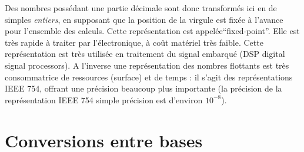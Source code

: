 \documentclass[a4paper,11pt]{article}
\begin{document}
Des nombres possédant une partie décimale sont donc transformés ici en de simples {\it entiers}, en supposant que la position de la virgule est fixée à l'avance pour l'ensemble des calculs. Cette représentation est appelée``fixed-point''. Elle est très rapide à traiter par l'électronique, à coût matériel très faible. Cette représentation est très utilisée en traitement du signal embarqué (DSP digital signal processors). A l'inverse une représentation des nombres flottants est très consommatrice de ressources (surface) et de temps : il s'agit des représentations IEEE 754, offrant une précision beaucoup plus importante (la précision de la représentation IEEE 754 simple précision est d'environ $10^{-8}$).

\section{Conversions entre bases}
\end{document}
